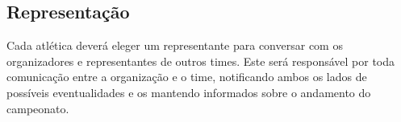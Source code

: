 \subsection{Representação}

Cada atlética deverá eleger um representante para conversar com os organizadores e representantes de outros times. Este será responsável por toda comunicação entre a organização e o time, notificando ambos os lados de possíveis eventualidades e os mantendo informados sobre o andamento do campeonato.
